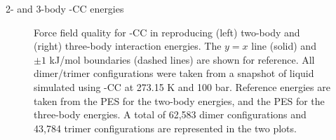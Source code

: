 \begin{section}{2- and 3-body \mastiff-CC \texorpdfstring{\co} {} energies}
\begin{figure}
\begin{minipage}[b]{0.4\textwidth}
      \end{minipage}
        \caption{
        Force field quality for \mastiff-CC in reproducing (left) two-body and
(right) three-body \co interaction energies. The $y=x$ line (solid) and $\pm 1$
kJ/mol boundaries (dashed lines) are shown for reference. All dimer/trimer configurations were 
taken from a snapshot of \co liquid simulated using \mastiff-CC at 273.15 K and 100 bar.
Reference energies are taken from the  PES for the
two-body energies, and the  PES for the three-body
energies. A total of 62,583 dimer configurations and 43,784 trimer
configurations are represented in the two plots.
                }
    \label{fig:2b_3b_comparison}
    \end{figure}


\end{section}
